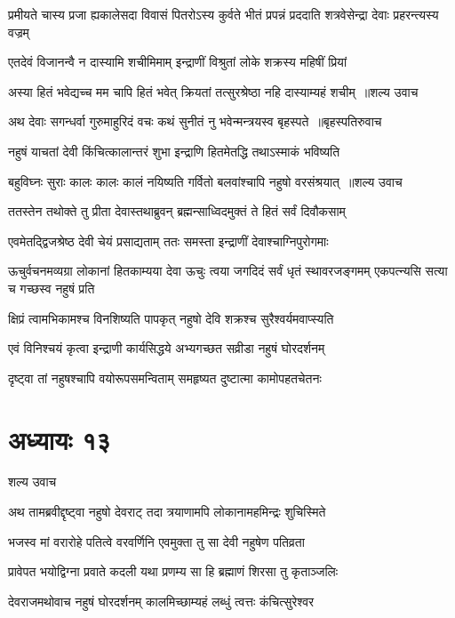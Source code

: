 \twolineshloka
{प्रमीयते चास्य प्रजा ह्यकालेसदा विवासं पितरोऽस्य कुर्वते}
{भीतं प्रपन्नं प्रददाति शत्रवेसेन्द्रा देवाः प्रहरन्त्यस्य वज्रम्}


\twolineshloka
{एतदेवं विजानन्वै न दास्यामि शचीमिमाम्}
{इन्द्राणीं विश्रुतां लोके शक्रस्य महिषीं प्रियां}


\threelineshloka
{अस्या हितं भवेद्यच्च मम चापि हितं भवेत्}
{क्रियतां तत्सुरश्रेष्ठा नहि दास्याम्यहं शचीम् ॥शल्य उवाच}
{}


\threelineshloka
{अथ देवाः सगन्धर्वा गुरुमाहुरिदं वचः}
{कथं सुनीतं नु भवेन्मन्त्रयस्व बृहस्पते ॥बृहस्पतिरुवाच}
{}


\twolineshloka
{नहुषं याचतां देवी किंचित्कालान्तरं शुभा}
{इन्द्राणि हितमेतद्धि तथाऽस्माकं भविष्यति}


\threelineshloka
{बहुविघ्नः सुराः कालः कालः कालं नयिष्यति}
{गर्वितो बलवांश्चापि नहुषो वरसंश्रयात् ॥शल्य उवाच}
{}


\twolineshloka
{ततस्तेन तथोक्ते तु प्रीता देवास्तथाब्रुवन्}
{ब्रह्मन्साध्विदमुक्तं ते हितं सर्वं दिवौकसाम्}


\twolineshloka
{एवमेतद्द्विजश्रेष्ठ देवी चेयं प्रसाद्यताम्}
{ततः समस्ता इन्द्राणीं देवाश्चाग्निपुरोगमाः}


\fourlineindentedshloka
{ऊचुर्वचनमव्यग्रा लोकानां हितकाम्यया}
{देवा ऊचुः}
{त्वया जगदिदं सर्वं धृतं स्थावरजङ्गमम्}
{एकपत्न्यसि सत्या च गच्छस्व नहुषं प्रति}


\twolineshloka
{क्षिप्रं त्वामभिकामश्च विनशिष्यति पापकृत्}
{नहुषो देवि शक्रश्च सुरैश्वर्यमवाप्स्यति}


\twolineshloka
{एवं विनिश्चयं कृत्वा इन्द्राणी कार्यसिद्धये}
{अभ्यगच्छत सव्रीडा नहुषं घोरदर्शनम्}


\twolineshloka
{दृष्ट्वा तां नहुषश्चापि वयोरूपसमन्विताम्}
{समहृष्यत दुष्टात्मा कामोपहतचेतनः}


\chapter{अध्यायः १३}
\twolineshloka
{शल्य उवाच}
{}


\twolineshloka
{अथ तामब्रवीद्दृष्ट्वा नहुषो देवराट् तदा}
{त्रयाणामपि लोकानामहमिन्द्रः शुचिस्मिते}


\twolineshloka
{भजस्व मां वरारोहे पतित्वे वरवर्णिनि}
{एवमुक्ता तु सा देवी नहुषेण पतिव्रता}


\twolineshloka
{प्रावेपत भयोद्विग्ना प्रवाते कदली यथा}
{प्रणम्य सा हि ब्रह्माणं शिरसा तु कृताञ्जलिः}


\twolineshloka
{देवराजमथोवाच नहुषं घोरदर्शनम्}
{कालमिच्छाम्यहं लब्धुं त्वत्तः कंचित्सुरेश्वर}


